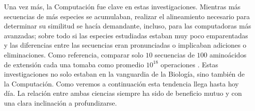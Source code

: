 Una vez más, la Computación fue clave en estas investigaciones.
Mientras más secuencias de más especies se acumulaban, realizar el alineamiento necesario para determinar su similitud se hacía demandante, incluso, para las computadoras más avanzadas;
sobre todo si las especies estudiadas estaban muy poco emparentadas y las diferencias entre las secuencias eran pronunciadas o implicaban adiciones o eliminaciones.
Como referencia, comparar solo $10$ secuencias de $100$ aminoácidos de extensión cada una tomaba como promedio $10^{18}$ operaciones \cite{wangComplexityMultipleSequence1994}.
Estas investigaciones no solo estaban en la vanguardia de la Biología, sino también de la Computación.
Como veremos a continuación esta tendencia llega hasta hoy día.
La relación entre ambas ciencias siempre ha sido de beneficio mutuo y con una clara inclinación a profundizarse.
